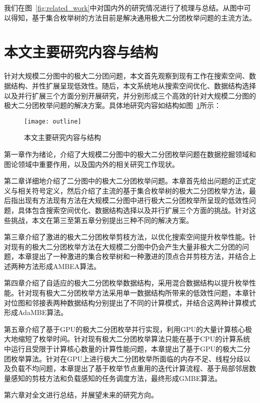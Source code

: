 我们在图~\ref{fig:related_work}中对国内外的研究情况进行了梳理与总结。从图中可以得知，基于集合枚举树的方法目前是解决通用极大二分团枚举问题的主流方法。

\section{本文主要研究内容与结构}

针对大规模二分图中的极大二分团问题，本文首先观察到现有工作在搜索空间、数据结构、并性扩展呈现低效性。随后，本文系统地从搜索空间优化、数据结构选择以及并行扩展三个方面分别开展研究，并分别形成三个高效的针对大规模二分图的极大二分团枚举问题的解决方案。具体地研究内容如结构如图~\ref{fig:outline}所示：

\begin{figure} [ht]
  \vspace{0.1 in}
  \centering
  \texttt{[image: outline]}
  \vspace{0.1 in}
  \caption{本文主要研究内容与结构}
  \label{fig:outline}
\end{figure}

第一章作为绪论，介绍了大规模二分图中的极大二分团枚举问题在数据挖掘领域和图论领域中重要作用，以及国内外的相关研究工作现状。

第二章详细地介绍了二分图中的极大二分团枚举问题。本章首先给出问题的正式定义与相关符号定义，然后介绍了主流的基于集合枚举树的极大二分团枚举方法，最后指出现有方法现有方法在大规模二分图中进行极大二分团枚举所呈现的低效性问题，具体包含搜索空间优化、数据结构选择以及并行扩展三个方面的挑战。针对这些挑战，本文在第三至第五章分别提出三种不同的解决方案。

第三章介绍了激进的极大二分团枚举剪枝方法，以优化搜索空间提升枚举性能。针对现有的极大二分团枚举方法在大规模二分图中仍会产生大量非极大二分团的问题，本章提出了一种激进的集合枚举树和一种激进的顶点合并剪枝方法，并结合上述两种方法形成AMBEA算法。%

第四章介绍了自适应的极大二分团枚举数据结构，采用混合数据结构以提升枚举性能。针对现有极大二分团枚举方法采用单一数据结构所带来的低效性问题，本章针对位图和邻接表两种数据结构分别提出了不同的计算模式，并结合这两种计算模式形成AdaMBE算法。%

第五章介绍了基于GPU的极大二分团枚举并行实现，利用GPU的大量计算核心极大地缩短了枚举时间。针对现有极大二分团枚举算法只能在基于CPU的计算系统中运行且受限于计算核心数量的计算性能问题，本章提出了基于GPU的极大二分团枚举算法。针对在GPU上进行极大二分团枚举所面临的内存不足、线程分歧以及负载不均问题，本章提出了基于枚举节点重用的迭代计算流程、基于局部邻居数量感知的剪枝方法和负载感知的任务调度方法，最终形成GMBE算法。%

第六章对全文进行总结，并展望未来的研究方向。



